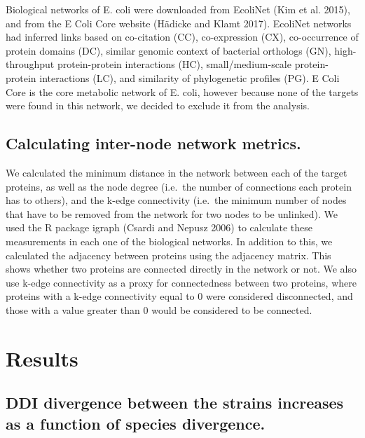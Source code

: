 \documentclass[]{elsarticle} %
\begin{document}
Biological networks of E. coli were downloaded from EcoliNet (Kim et al. 2015), and from the E Coli Core website (Hädicke and Klamt 2017). EcoliNet networks had inferred links based on co-citation (CC), co-expression (CX), co-occurrence of protein domains (DC), similar genomic context of bacterial orthologs (GN), high-throughput protein-protein interactions (HC), small/medium-scale protein-protein interactions (LC), and similarity of phylogenetic profiles (PG). E Coli Core is the core metabolic network of E. coli, however because none of the targets were found in this network, we decided to exclude it from the analysis.

\hypertarget{calculating-inter-node-network-metrics.}{%
\subsection{Calculating inter-node network metrics.}\label{calculating-inter-node-network-metrics.}}

We calculated the minimum distance in the network between each of the target proteins, as well as the node degree (i.e.~the number of connections each protein has to others), and the k-edge connectivity (i.e.~the minimum number of nodes that have to be removed from the network for two nodes to be unlinked). We used the R package igraph (Csardi and Nepusz 2006) to calculate these measurements in each one of the biological networks. In addition to this, we calculated the adjacency between proteins using the adjacency matrix. This shows whether two proteins are connected directly in the network or not. We also use k-edge connectivity as a proxy for connectedness between two proteins, where proteins with a k-edge connectivity equal to 0 were considered disconnected, and those with a value greater than 0 would be considered to be connected.

\hypertarget{results}{%
\section{Results}\label{results}}

\hypertarget{ddi-divergence-between-the-strains-increases-as-a-function-of-species-divergence.}{%
\subsection{DDI divergence between the strains increases as a function of species divergence.}\label{ddi-divergence-between-the-strains-increases-as-a-function-of-species-divergence.}}
\end{document}
